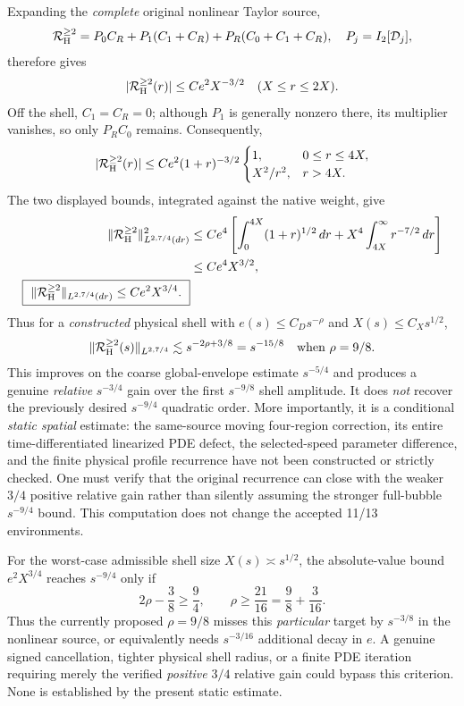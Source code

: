 \documentclass[11pt]{amsart}
\begin{document}
Expanding the \emph{complete} original nonlinear Taylor source,
\[
 \mathcal R_{\rm H}^{\ge2}
  =P_0C_R+P_1(C_1+C_R)+P_R(C_0+C_1+C_R),
 \quad P_j=I_2[\mathcal D_j],
\]
therefore gives
\[
 |\mathcal R_{\rm H}^{\ge2}(r)|
 \le C e^2X^{-3/2}\quad(X\le r\le2X).
\]
Off the shell, $C_1=C_R=0$; although $P_1$ is generally
nonzero there, its multiplier vanishes, so only $P_RC_0$ remains.  Consequently,
\[
 |\mathcal R_{\rm H}^{\ge2}(r)|
 \le C e^2(1+r)^{-3/2}
   \begin{cases}
    1,&0\le r\le4X,\\
    X^2/r^2,&r>4X.
   \end{cases}
\]
The two displayed bounds, integrated against the native weight,
give
\[
 \begin{split}
 \|\mathcal R_{\rm H}^{\ge2}\|_{L^{2,7/4}(dr)}^2
 &\le C e^4\left[
   \int_0^{4X}(1+r)^{1/2}\,dr
  +X^4\int_{4X}^{\infty}r^{-7/2}\,dr\right]\\
 &\le C e^4X^{3/2},\\
 \boxed{\ 
 \|\mathcal R_{\rm H}^{\ge2}\|_{L^{2,7/4}(dr)}
 \le C e^2X^{3/4}.\ }
 \end{split}
\]
Thus for a \emph{constructed} physical shell with
$e(s)\le C_Ds^{-\rho}$ and $X(s)\le C_Xs^{1/2}$,
\[
 \|\mathcal R_{\rm H}^{\ge2}(s)\|_{L^{2,7/4}}
 \lesssim s^{-2\rho+3/8}
 =s^{-15/8}\quad\text{when }\rho=9/8.
\]
This improves on the coarse global-envelope estimate
$s^{-5/4}$ and produces a genuine \emph{relative}
$s^{-3/4}$ gain over the first $s^{-9/8}$ shell amplitude.
It does \emph{not} recover the previously desired
$s^{-9/4}$ quadratic order.  More importantly, it is a
conditional \emph{static spatial} estimate: the same-source
moving four-region correction, its entire time-differentiated
linearized PDE defect, the selected-speed parameter difference,
and the finite physical profile recurrence have not been constructed
or strictly checked.  One must verify that the original recurrence
can close with the weaker $3/4$ positive relative gain rather than
silently assuming the stronger full-bubble $s^{-9/4}$ bound.
This computation does not change the accepted 11/13 environments.

For the worst-case admissible shell size $X(s)\asymp s^{1/2}$,
the absolute-value bound $e^2X^{3/4}$ reaches $s^{-9/4}$
only if
\[
 2\rho-\frac38\ge\frac94,
 \qquad \rho\ge\frac{21}{16}
   =\frac98+\frac{3}{16}.
\]
Thus the currently proposed $\rho=9/8$ misses this
\emph{particular} target by $s^{-3/8}$ in the nonlinear
source, or equivalently needs $s^{-3/16}$ additional
decay in $e$. A genuine signed cancellation, tighter physical
shell radius, or a finite PDE iteration requiring merely the
verified \emph{positive} $3/4$ relative gain could bypass this
criterion. None is established by the present static estimate.
\end{document}
